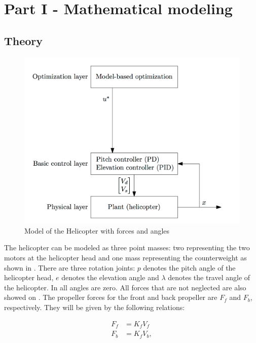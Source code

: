 \documentclass[12pt, a4paper]{article}%
\begin{document}
\section{Part I - Mathematical modeling}
\subsection*{Theory}

\label{S:2}

\begin{figure}[h!]
\begin{center}
\centering
\includegraphics[scale=0.3]{Figur.png}
\caption{Model of the Helicopter with forces and angles}
\label{fig:model2}
\end{center}
\end{figure}


The helicopter can be modeled as three point masses: two representing the two motors at the helicopter head and one mass representing the counterweight as shown in . There are three rotation joints: $p$ denotes the pitch angle of the helicopter head, $e$ denotes the elevation angle and $\lambda$ denotes the travel angle of the helicopter. In  all angles are zero. All forces that are not neglected are also showed on . The propeller forces for the front and back propeller are $F_f$ and $F_b$, respectively. They will be given by the following relations:

\begin{subequations}
\label{Fp}
\begin{alignat}{2}
F_f & = K_f V_f\\
F_b & = K_f V_b,
\end{alignat}
\end{subequations}
\end{document}
